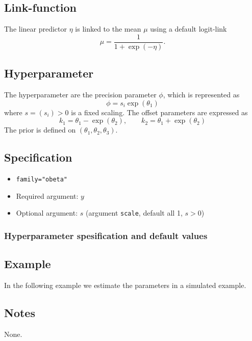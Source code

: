 \documentclass[a4paper,11pt]{article}
\begin{document}
\subsection*{Link-function}

The linear predictor $\eta$ is linked to the mean $\mu$ using a
default logit-link
\begin{displaymath}
    \mu = \frac{1}{1+\exp(-\eta)}.
\end{displaymath}

\subsection*{Hyperparameter}

The hyperparameter are the precision parameter $\phi$, which is
represented as
\begin{displaymath}
    \phi = s_i \exp(\theta_1)
\end{displaymath}
where $s = (s_i) > 0$ is a fixed scaling. The offset parameters are expressed as
\begin{displaymath}
    k_1 = \theta_1 - \exp(\theta_2), \qquad
    k_2 = \theta_1 + \exp(\theta_2)
\end{displaymath}
The prior is defined on $(\theta_1, \theta_2, \theta_3)$.


\subsection*{Specification}

\begin{itemize}
\item \texttt{family="obeta"}
\item Required argument: $y$
\item Optional argument: $s$ (argument \texttt{scale}, default all 1, $s>0$)
\end{itemize}

\subsubsection*{Hyperparameter spesification and default values}


\subsection*{Example}

In the following example we estimate the parameters in a simulated
example.



\subsection*{Notes}

None.
\end{document}
